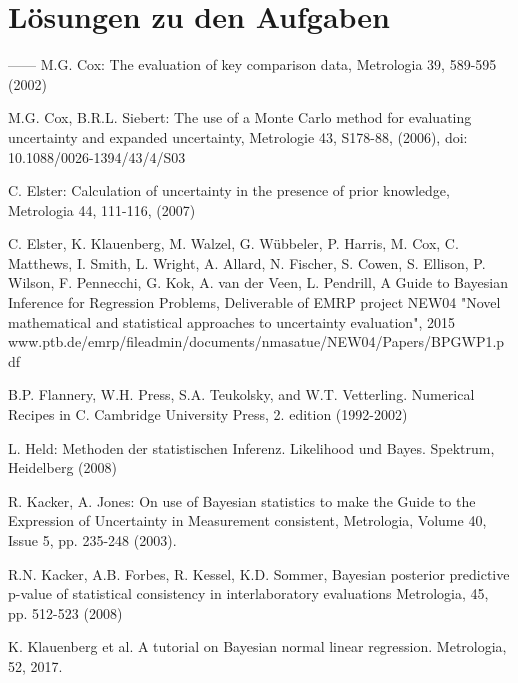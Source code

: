 \documentclass[a4paper,11pt]{book}
\begin{document}
\chapter{Lösungen zu den Aufgaben}




\begin{flushleft}
\begin{thebibliography}{------}
     M.G. Cox: The evaluation of key comparison data, Metrologia 39, 589-595 (2002)

     M.G. Cox, B.R.L. Siebert: The use of
    a Monte Carlo method for evaluating uncertainty and expanded uncertainty, Metrologie 43, S178-88, (2006), doi: 10.1088/0026-1394/43/4/S03

     C. Elster: Calculation of uncertainty in the presence of prior knowledge, Metrologia 44, 111-116, (2007)

     C. Elster, K. Klauenberg, M. Walzel, G. Wübbeler, P. Harris, M. Cox, C. Matthews, I. Smith, L. Wright, A. Allard, N. Fischer, S. Cowen, S. Ellison,
    P. Wilson, F. Pennecchi, G. Kok, A. van der Veen, L. Pendrill,
    A Guide to Bayesian Inference for Regression Problems, Deliverable of EMRP project NEW04 "Novel mathematical and statistical approaches to uncertainty evaluation", 2015 \newline
    www.ptb.de/emrp/fileadmin/documents/nmasatue/NEW04/Papers/BPGWP1.pdf

     B.P. Flannery, W.H. Press, S.A. Teukolsky, and W.T. Vetterling. Numerical Recipes in C. Cambridge University Press, 2. edition (1992-2002)

     L. Held: Methoden der statistischen Inferenz. Likelihood und Bayes. Spektrum, Heidelberg (2008)

     R. Kacker, A. Jones: On use of Bayesian statistics to make the Guide to the Expression of Uncertainty in Measurement consistent, Metrologia, Volume 40, Issue 5, pp. 235-248 (2003).

     R.N. Kacker, A.B. Forbes, R. Kessel, K.D. Sommer, Bayesian posterior predictive
    p-value of statistical consistency in interlaboratory evaluations Metrologia, 45, pp. 512-523 (2008)

     K. Klauenberg et al. A tutorial on Bayesian normal linear regression. Metrologia, 52, 2017.


\end{thebibliography}
\end{flushleft}
\end{document}
